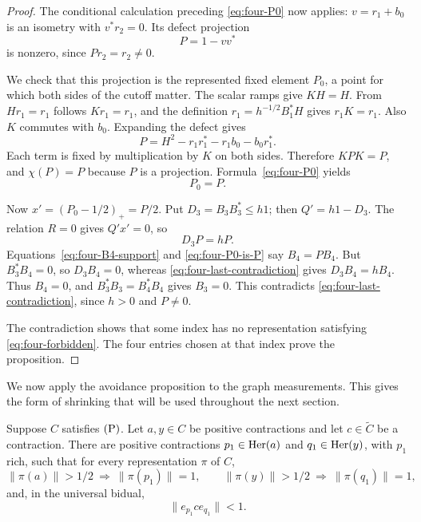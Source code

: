 \begin{proof}
The conditional calculation preceding \eqref{eq:four-P0} now
applies: \(v=r_1+b_0\) is an isometry with \(v^*r_2=0\).
Its defect projection
\[
 P=1-vv^*
\]
is nonzero, since \(Pr_2=r_2\ne0\).

We check that this projection is the represented fixed element
\(P_0\), a point for which both sides of the cutoff matter.
The scalar ramps give \(KH=H\).  From \(Hr_1=r_1\) follows
\(Kr_1=r_1\), and the definition \(r_1=h^{-1/2}B_1^*H\)
gives \(r_1K=r_1\).  Also \(K\) commutes with \(b_0\).
Expanding the defect gives
\[
 P=H^2-r_1r_1^*-r_1b_0-b_0r_1^*.
\]
Each term is fixed by multiplication by \(K\) on both sides.
Therefore \(KPK=P\), and \(\chi(P)=P\) because \(P\) is a
projection.  Formula~\eqref{eq:four-P0} yields
\begin{equation}\label{eq:four-P0-is-P}
 P_0=P.
\end{equation}

Now \(x'=(P_0-1/2)_+=P/2\).  Put \(D_3=B_3B_3^*\le h1\);
then \(Q'=h1-D_3\).  The relation \(R=0\) gives
\(Q'x'=0\), so
\begin{equation}\label{eq:four-last-contradiction}
 D_3P=hP.
\end{equation}
Equations~\eqref{eq:four-B4-support} and
\eqref{eq:four-P0-is-P} say \(B_4=PB_4\).
But \(B_3^*B_4=0\), so \(D_3B_4=0\), whereas
\eqref{eq:four-last-contradiction} gives \(D_3B_4=hB_4\).
Thus \(B_4=0\), and
\(B_3^*B_3=B_4^*B_4\) gives \(B_3=0\).
This contradicts \eqref{eq:four-last-contradiction}, since
\(h>0\) and \(P\ne0\).

The contradiction shows that some index has no representation
satisfying \eqref{eq:four-forbidden}.  The four entries chosen
at that index prove the proposition.
\end{proof}

We now apply the avoidance proposition to the graph measurements.
This gives the form of shrinking that will be used throughout the
next section.

\begin{proposition}
\label{prop:shrinking-P}
Suppose \(C\) satisfies \(\textup{(P)}\).  Let \(a,y\in C\) be positive
contractions and let \(c\in\widetilde C\) be a contraction.  There
are positive contractions \(p_1\in\operatorname{Her}(a)\) and
\(q_1\in\operatorname{Her}(y)\), with \(p_1\) rich, such that for every
representation \(\pi\) of \(C\),
\begin{equation}\label{eq:shrinking-P-signals}
 \|\pi(a)\|>1/2\ \Longrightarrow\ \|\pi(p_1)\|=1,
 \qquad
 \|\pi(y)\|>1/2\ \Longrightarrow\ \|\pi(q_1)\|=1,
\end{equation}
and, in the universal bidual,
\begin{equation}\label{eq:shrinking-P-support}
 \|e_{p_1}c e_{q_1}\|<1.
\end{equation}
\end{proposition}

